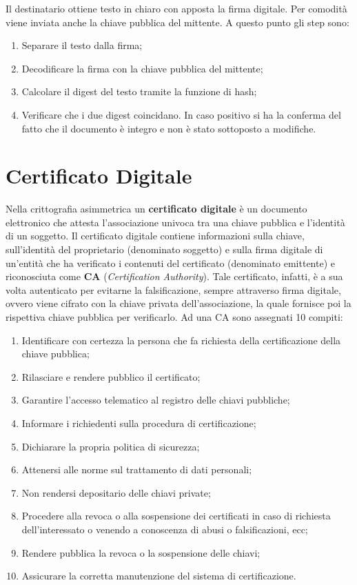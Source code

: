 Il destinatario ottiene testo in chiaro con apposta la firma digitale.
Per comodità viene inviata anche la chiave pubblica del mittente. A
questo punto gli step sono:

\begin{enumerate}
    \item Separare il testo dalla firma;
    \item Decodificare la firma con la chiave pubblica del mittente;
    \item Calcolare il digest del testo tramite la funzione di hash;
    \item Verificare che i due digest coincidano. In caso positivo si ha
          la conferma del fatto che il documento è integro e non è stato
          sottoposto a modifiche.
\end{enumerate}

\section{Certificato Digitale}

Nella crittografia asimmetrica un \textbf{certificato digitale} è un 
documento elettronico che attesta
l'associazione univoca tra una chiave pubblica e l'identità di un soggetto.
Il certificato digitale contiene informazioni sulla chiave,
sull'identità del proprietario
(denominato soggetto) e sulla firma digitale di un'entità che ha verificato
i contenuti del certificato
(denominato emittente) e riconosciuta come \textbf{CA}
(\textit{Certification Authority}).
Tale certificato, infatti, è
a sua volta autenticato per evitarne la falsificazione, sempre attraverso
firma digitale, ovvero viene
cifrato con la chiave privata dell'associazione, la quale fornisce poi la 
rispettiva chiave pubblica per
verificarlo.
Ad una CA sono assegnati 10 compiti:
\begin{enumerate}
    \item Identificare con certezza la persona che fa richiesta della certificazione della chiave
          pubblica;
    \item Rilasciare e rendere pubblico il certificato;
    \item Garantire l'accesso telematico al registro delle chiavi pubbliche;
    \item Informare i richiedenti sulla procedura di certificazione;
    \item Dichiarare la propria politica di sicurezza;
    \item Attenersi alle norme sul trattamento di dati personali;
    \item Non rendersi depositario delle chiavi private;
    \item Procedere alla revoca o alla sospensione dei certificati in caso di richiesta dell'interessato o
          venendo a conoscenza di abusi o falsificazioni, ecc;
    \item Rendere pubblica la revoca o la sospensione delle chiavi;
    \item Assicurare la corretta manutenzione del sistema di certificazione.
\end{enumerate}

